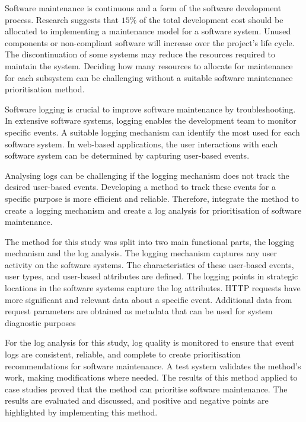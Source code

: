 Software maintenance is continuous and a form of the software development process. Research suggests that $15\%$ of the total development cost should be allocated to implementing a maintenance model for a software system. Unused components or non-compliant software will increase over the project's life cycle. The discontinuation of some systems may reduce the resources required to maintain the system. Deciding how many resources to allocate for maintenance for each subsystem can be challenging without a suitable software maintenance prioritisation method. \par Software logging is crucial to improve software maintenance by troubleshooting. In extensive software systems, logging enables the development team to monitor specific events. A suitable logging mechanism can identify the most used for each software system. In web-based applications, the user interactions with each software system can be determined by capturing user-based events. \par Analysing logs can be challenging if the logging mechanism does not track the desired user-based events. Developing a method to track these events for a specific purpose is more efficient and reliable. Therefore, integrate the method to create a logging mechanism and create a log analysis for prioritisation of software maintenance. \par The method for this study was split into two main functional parts, the logging mechanism and the log analysis. The logging mechanism captures any user activity on the software systems. The characteristics of these user-based events, user types, and user-based attributes are defined. The logging points in strategic locations in the software systems capture the log attributes. HTTP requests have more significant and relevant data about a specific event. Additional data from request parameters are obtained as metadata that can be used for system diagnostic purposes\par For the log analysis for this study, log quality is monitored to ensure that event logs are consistent, reliable, and complete to create prioritisation recommendations for software maintenance. A test system validates the method's work, making modifications where needed. The results of this method applied to case studies proved that the method can prioritise software maintenance. The results are evaluated and discussed, and positive and negative points are highlighted by implementing this method.
